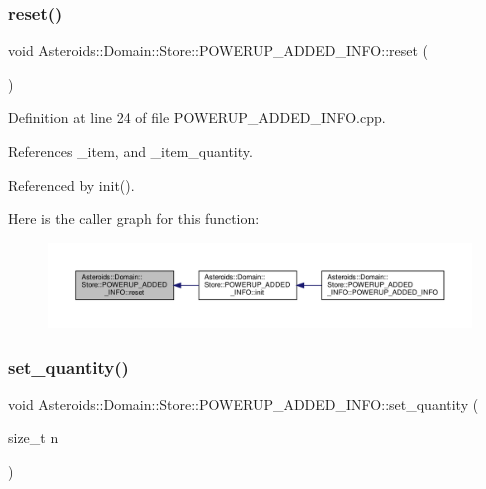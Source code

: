 \subsubsection{\texorpdfstring{reset()}{reset()}}
{\footnotesize\ttfamily void Asteroids\+::\+Domain\+::\+Store\+::\+P\+O\+W\+E\+R\+U\+P\+\_\+\+A\+D\+D\+E\+D\+\_\+\+I\+N\+F\+O\+::reset (\begin{DoxyParamCaption}{ }\end{DoxyParamCaption})}



Definition at line 24 of file P\+O\+W\+E\+R\+U\+P\+\_\+\+A\+D\+D\+E\+D\+\_\+\+I\+N\+F\+O.\+cpp.



References \+\_\+item, and \+\_\+item\+\_\+quantity.



Referenced by init().

Here is the caller graph for this function\+:\nopagebreak
\begin{figure}[H]
\begin{center}
\leavevmode
\includegraphics[width=350pt]{classAsteroids_1_1Domain_1_1Store_1_1POWERUP__ADDED__INFO_ae972bd3da19ae2dfea1230920b0aafc4_icgraph}
\end{center}
\end{figure}
\mbox{\label{classAsteroids_1_1Domain_1_1Store_1_1POWERUP__ADDED__INFO_afe8099b9e4266e1dd30e9d2908c17381}} 
\subsubsection{\texorpdfstring{set\+\_\+quantity()}{set\_quantity()}}
{\footnotesize\ttfamily void Asteroids\+::\+Domain\+::\+Store\+::\+P\+O\+W\+E\+R\+U\+P\+\_\+\+A\+D\+D\+E\+D\+\_\+\+I\+N\+F\+O\+::set\+\_\+quantity (\begin{DoxyParamCaption}\item[{size\+\_\+t}]{n }\end{DoxyParamCaption})\hspace{0.3cm}{\ttfamily [virtual]}}



